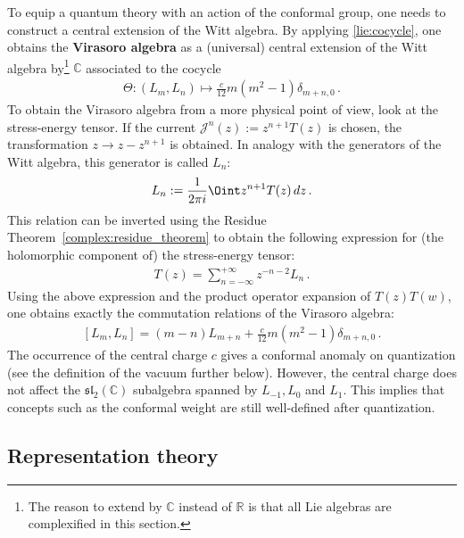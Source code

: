     To equip a quantum theory with an action of the conformal group, one needs to construct a central extension of the Witt algebra. By applying \cref{lie:cocycle}, one obtains the \textbf{Virasoro algebra} as a (universal) central extension of the Witt algebra by\footnote{The reason to extend by $\mathbb{C}$ instead of $\mathbb{R}$ is that all Lie algebras are complexified in this section.} $\mathbb{C}$ associated to the cocycle
    \begin{gather}
        \Theta:(L_m,L_n)\mapsto\frac{c}{12}m(m^2-1)\delta_{m+n,0}\,.
    \end{gather}
    To obtain the Virasoro algebra from a more physical point of view, look at the stress-energy tensor. If the current $\mathcal{J}^n(z) := z^{n+1}T(z)$ is chosen, the transformation $z\longrightarrow z-z^{n+1}$ is obtained. In analogy with the generators of the Witt algebra, this generator is called $L_n$:
    \begin{gather}
        L_n := \frac{1}{2\pi i}\Oint z^{n+1}T(z)\,dz\,.
    \end{gather}
    This relation can be inverted using the Residue Theorem~\ref{complex:residue_theorem} to obtain the following expression for (the holomorphic component of) the stress-energy tensor:
    \begin{gather}
        \label{cft:stress_energy_tensor}
        T(z) = \sum_{n=-\infty}^{+\infty}z^{-n-2}L_n\,.
    \end{gather}
    Using the above expression and the product operator expansion of $T(z)T(w)$, one obtains exactly the commutation relations of the Virasoro algebra:
    \begin{gather}
        \label{cft:virasoro_algebra}
        [L_m,L_n] = (m-n)L_{m+n} + \frac{c}{12}m(m^2-1)\delta_{m+n,0}\,.
    \end{gather}
    The occurrence of the central charge $c$ gives a conformal anomaly on quantization (see the definition of the vacuum further below). However, the central charge does not affect the $\mathfrak{sl}_2(\mathbb{C})$ subalgebra spanned by $L_{-1},L_0$ and $L_1$. This implies that concepts such as the conformal weight are still well-defined after quantization.

\subsection{Representation theory}


